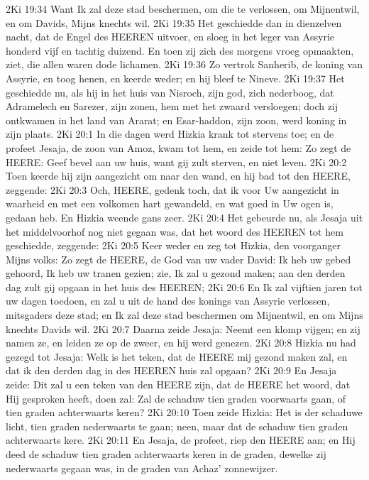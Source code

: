 2Ki 19:34  Want Ik zal deze stad beschermen, om die te verlossen, om Mijnentwil, en om Davids, Mijns knechts wil.
2Ki 19:35  Het geschiedde dan in dienzelven nacht, dat de Engel des HEEREN uitvoer, en sloeg in het leger van Assyrie honderd vijf en tachtig duizend. En toen zij zich des morgens vroeg opmaakten, ziet, die allen waren dode lichamen.
2Ki 19:36  Zo vertrok Sanherib, de koning van Assyrie, en toog henen, en keerde weder; en hij bleef te Nineve.
2Ki 19:37  Het geschiedde nu, als hij in het huis van Nisroch, zijn god, zich nederboog, dat Adramelech en Sarezer, zijn zonen, hem met het zwaard versloegen; doch zij ontkwamen in het land van Ararat; en Esar-haddon, zijn zoon, werd koning in zijn plaats.
2Ki 20:1  In die dagen werd Hizkia krank tot stervens toe; en de profeet Jesaja, de zoon van Amoz, kwam tot hem, en zeide tot hem: Zo zegt de HEERE: Geef bevel aan uw huis, want gij zult sterven, en niet leven.
2Ki 20:2  Toen keerde hij zijn aangezicht om naar den wand, en hij bad tot den HEERE, zeggende:
2Ki 20:3  Och, HEERE, gedenk toch, dat ik voor Uw aangezicht in waarheid en met een volkomen hart gewandeld, en wat goed in Uw ogen is, gedaan heb. En Hizkia weende gans zeer.
2Ki 20:4  Het gebeurde nu, als Jesaja uit het middelvoorhof nog niet gegaan was, dat het woord des HEEREN tot hem geschiedde, zeggende:
2Ki 20:5  Keer weder en zeg tot Hizkia, den voorganger Mijns volks: Zo zegt de HEERE, de God van uw vader David: Ik heb uw gebed gehoord, Ik heb uw tranen gezien; zie, Ik zal u gezond maken; aan den derden dag zult gij opgaan in het huis des HEEREN;
2Ki 20:6  En Ik zal vijftien jaren tot uw dagen toedoen, en zal u uit de hand des konings van Assyrie verlossen, mitsgaders deze stad; en Ik zal deze stad beschermen om Mijnentwil, en om Mijns knechts Davids wil.
2Ki 20:7  Daarna zeide Jesaja: Neemt een klomp vijgen; en zij namen ze, en leiden ze op de zweer, en hij werd genezen.
2Ki 20:8  Hizkia nu had gezegd tot Jesaja: Welk is het teken, dat de HEERE mij gezond maken zal, en dat ik den derden dag in des HEEREN huis zal opgaan?
2Ki 20:9  En Jesaja zeide: Dit zal u een teken van den HEERE zijn, dat de HEERE het woord, dat Hij gesproken heeft, doen zal: Zal de schaduw tien graden voorwaarts gaan, of tien graden achterwaarts keren?
2Ki 20:10  Toen zeide Hizkia: Het is der schaduwe licht, tien graden nederwaarts te gaan; neen, maar dat de schaduw tien graden achterwaarts kere.
2Ki 20:11  En Jesaja, de profeet, riep den HEERE aan; en Hij deed de schaduw tien graden achterwaarts keren in de graden, dewelke zij nederwaarts gegaan was, in de graden van Achaz' zonnewijzer.
